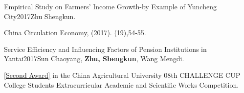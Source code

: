 \documentclass{joel_cv}
\begin{document}
\begin{enumerate}[label={[\arabic*]}]
	
	\item \begin{sectionContentNormal}{Empirical Study on Farmers' Income Growth-by Example of Yuncheng City}{2017}{Zhu Shengkun.}
		\item China Circulation Economy, (2017). (19),54-55.
		\quad[\href{https://kns.cnki.net/kcms/detail/detail.aspx?dbcode=CJFD&dbname=CJFDLAST2017&filename=QGSQ201719028&uniplatform=NZKPT&v=IsduICfXGkpNfx1F_0K9u6eESoBSqhWDWF8tW_7gLvlD707-79CtCDU51kR-3Rqb}{Paper}]
	\end{sectionContentNormal}
	
	
	
	\item \begin{sectionContentNormal}{Service Efficiency and Influencing Factors of Pension Institutions in Yantai}{2017}{Sun Chaoyang, \textbf{Zhu, Shengkun}, Wang Mengdi.}
		\item \href{https://zhu-sk.github.io/ChallengeCup.jpg}{[Second Award]} in the China Agricultural University 08th CHALLENGE CUP College Students Extracurricular Academic and Scientific Works Competition. 
	\end{sectionContentNormal}

\end{enumerate}



\end{document}
